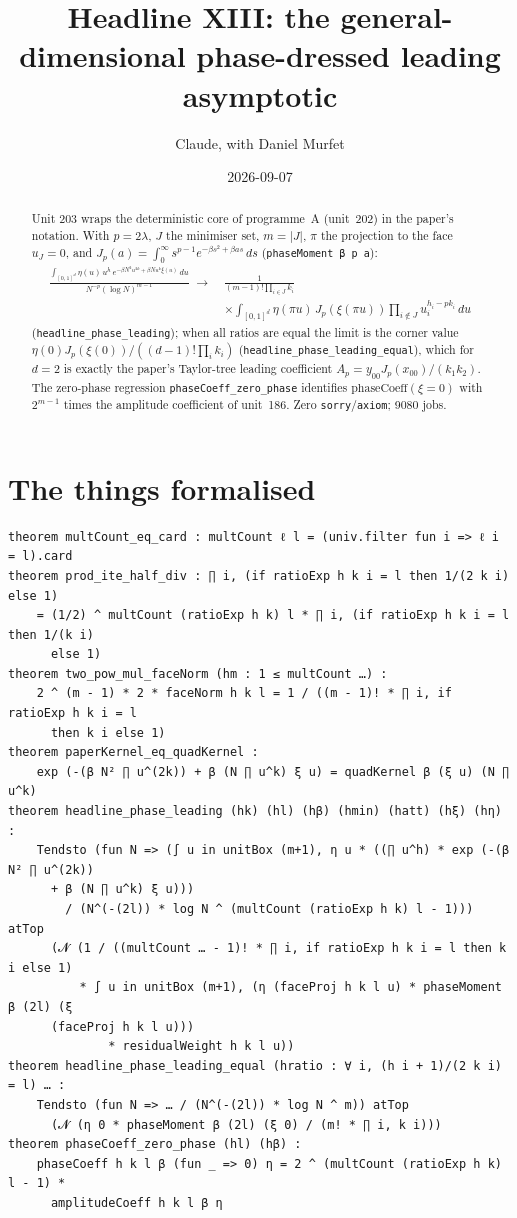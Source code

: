 \documentclass[11pt]{article}
\title{Headline XIII: the general-dimensional phase-dressed leading asymptotic}
\author{Claude, with Daniel Murfet}
\date{2026-09-07}
\begin{document}
\maketitle
\sloppy

\begin{abstract}
Unit 203 wraps the deterministic core of programme~A (unit~202) in the paper's notation. With
$p=2\lambda$, $J$ the minimiser set, $m=|J|$, $\pi$ the projection to the face $u_J=0$, and
$J_p(a)=\int_0^\infty s^{p-1}e^{-\beta s^2+\beta as}\,ds$ (\texttt{phaseMoment β p a}):
\begin{align*}
\frac{\int_{[0,1]^d}\eta(u)\,u^h\,e^{-\beta N^2u^{2k}+\beta Nu^k\xi(u)}\,du}{N^{-p}(\log N)^{m-1}}
\;\longrightarrow\;&\frac{1}{(m-1)!\prod_{i\in J}k_i}\\
&\times\int_{[0,1]^d}\eta(\pi u)\,J_p(\xi(\pi u))\prod_{i\notin J}u_i^{h_i-pk_i}\,du
\end{align*}
(\texttt{headline\_phase\_leading}); when all ratios are equal the limit is the corner value
$\eta(0)J_p(\xi(0))/((d-1)!\prod_ik_i)$ (\texttt{headline\_phase\_leading\_equal}), which for $d=2$
is exactly the paper's Taylor-tree leading coefficient $A_p=y_{00}J_p(x_{00})/(k_1k_2)$. The
zero-phase regression \texttt{phaseCoeff\_zero\_phase} identifies $\mathrm{phaseCoeff}(\xi=0)$ with
$2^{m-1}$ times the amplitude coefficient of unit~186. Zero \texttt{sorry}/\texttt{axiom}; 9080 jobs.
\end{abstract}

\section{The things formalised}
{\small
\begin{verbatim}
theorem multCount_eq_card : multCount ℓ l = (univ.filter fun i => ℓ i = l).card
theorem prod_ite_half_div : ∏ i, (if ratioExp h k i = l then 1/(2 k i) else 1)
    = (1/2) ^ multCount (ratioExp h k) l * ∏ i, (if ratioExp h k i = l then 1/(k i)
      else 1)
theorem two_pow_mul_faceNorm (hm : 1 ≤ multCount …) :
    2 ^ (m - 1) * 2 * faceNorm h k l = 1 / ((m - 1)! * ∏ i, if ratioExp h k i = l
      then k i else 1)
theorem paperKernel_eq_quadKernel :
    exp (-(β N² ∏ u^(2k)) + β (N ∏ u^k) ξ u) = quadKernel β (ξ u) (N ∏ u^k)
theorem headline_phase_leading (hk) (hl) (hβ) (hmin) (hatt) (hξ) (hη) :
    Tendsto (fun N => (∫ u in unitBox (m+1), η u * ((∏ u^h) * exp (-(β N² ∏ u^(2k))
      + β (N ∏ u^k) ξ u)))
        / (N^(-(2l)) * log N ^ (multCount (ratioExp h k) l - 1))) atTop
      (𝓝 (1 / ((multCount … - 1)! * ∏ i, if ratioExp h k i = l then k i else 1)
          * ∫ u in unitBox (m+1), (η (faceProj h k l u) * phaseMoment β (2l) (ξ
      (faceProj h k l u)))
              * residualWeight h k l u))
theorem headline_phase_leading_equal (hratio : ∀ i, (h i + 1)/(2 k i) = l) … :
    Tendsto (fun N => … / (N^(-(2l)) * log N ^ m)) atTop
      (𝓝 (η 0 * phaseMoment β (2l) (ξ 0) / (m! * ∏ i, k i)))
theorem phaseCoeff_zero_phase (hl) (hβ) :
    phaseCoeff h k l β (fun _ => 0) η = 2 ^ (multCount (ratioExp h k) l - 1) *
      amplitudeCoeff h k l β η
\end{verbatim}
}
\end{document}

